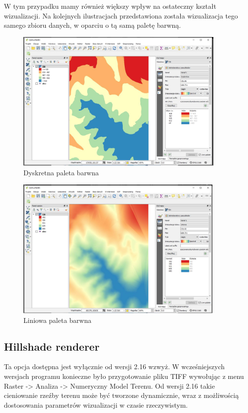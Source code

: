\documentclass[12pt,a4paper]{book}
\begin{document}
W tym przypadku mamy również większy wpływ na ostateczny kształt wizualizacji. Na kolejnych ilustracjach przedstawiona została wizualizacja tego samego zbioru danych, w oparciu o tą samą paletę barwną.
\begin{figure}[!ht]
	\centering
\includegraphics[height=7cm]{007-raster-dyskretna.png}
\caption{Dyskretna paleta barwna}
\end{figure}
\begin{figure}[!ht]
	\centering
\includegraphics[height=7cm]{007-raster-liniowa.jpg}
\caption{Liniowa paleta barwna}
\end{figure}

\subsection{Hillshade renderer}
Ta opcja dostępna jest wyłącznie od wersji 2.16 wzwyż. W wcześniejszych wersjach programu konieczne było przygotowanie pliku TIFF wywołując z menu Raster -{\textgreater} Analiza -{\textgreater} Numeryczny Model Terenu. Od wersji 2.16 takie cieniowanie rzeźby terenu może być tworzone dynamicznie, wraz z możliwością dostosowania parametrów wizualizacji w czasie rzeczywistym.
\end{document}
